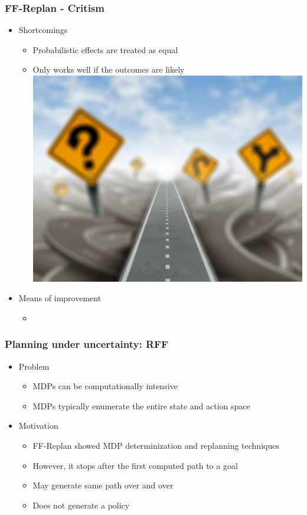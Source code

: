 \documentclass{beamer}
\let\origframetitle=\frametitle
\renewcommand\frametitle[1]{\origframetitle{\textbf{\large{\textrm{#1}}}}}
\begin{document}
\begin{frame}
  \frametitle{FF-Replan - Critism}

  \begin{itemize}
    \item Shortcomings
      \begin{itemize}
        \item Probabilistic effects are treated as equal
        \item Only works well if the outcomes are likely
          \includegraphics[scale=0.01]{images/direction-road-maze.jpg}
      \end{itemize}
    \item Means of improvement
      \begin{itemize}
        \item
      \end{itemize}
   \end{itemize}
\end{frame}

\begin{frame}
  \frametitle{Planning under uncertainty: RFF}

  \begin{itemize}
    \item Problem
      \begin{itemize}
        \item MDPs can be computationally intensive
        \item MDPs typically enumerate the entire state and action space
      \end{itemize}
    \item Motivation
      \begin{itemize}
        \item FF-Replan showed MDP determinization and replanning techniques
        \item However, it stops after the first computed path to a goal
        \item May generate same path over and over
        \item Does not generate a policy
      \end{itemize}
  \end{itemize}

\end{frame}
\end{document}
